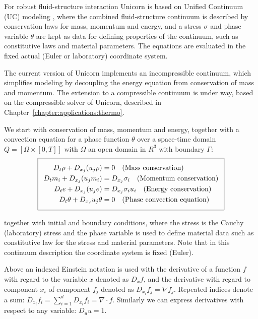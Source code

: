 For robust fluid-structure interaction Unicorn is based on Unified
Continuum (UC) modeling \cite{HoffmanJanssonEtAl2009}, where the
combined fluid-structure continuum is described by conservation laws
for mass, momentum and energy, and a stress $\sigma$ and phase
variable $\theta$ are kept as data for defining properties of the
continuum, such as constitutive laws and material parameters. The
equations are evaluated in the fixed actual (Euler or laboratory)
coordinate system.

The current version of Unicorn implements an incompressible continuum,
which simplifies modeling by decoupling the energy equation from
conservation of mass and momentum. The extension to a compressible
continuum is under way, based on the compressible solver of Unicorn,
described in Chapter~\ref{chapter:applications:thermo}.

We start with conservation of mass, momentum and energy, together with
a convection equation for a phase function $\theta$ over a space-time
domain $Q = [\Omega \times [0, T]]$ with $\Omega$ an open domain in
$R^3$ with boundary $\Gamma$:
\begin{equation}
  \addtolength{\fboxsep}{5pt}
  \boxed{
    \begin{split}\label{eq:TotalModel}
      D_t \rho + D_{x_j} (u_j \rho) &= 0
      \quad \text{(Mass conservation)}\\
      D_t m_i + D_{x_j} (u_j m_i) &= D_{x_j} \sigma_i
      \quad \text{(Momentum conservation)}\\
      D_t e + D_{x_j} (u_j e) &= D_{x_j} \sigma_i u_i
      \quad \text{(Energy conservation)}\\
      D_t \theta + D_{x_j} u_j \theta &= 0
      \quad \text{(Phase convection equation)}
    \end{split}
  }
\end{equation}

together with initial and boundary conditions, where the stress is the
Cauchy (laboratory) stress and the phase variable is used to define
material data such as constitutive law for the stress and material
parameters. Note that in this continuum description the coordinate
system is fixed (Euler).

Above an indexed Einstein notation is used with the derivative of a
function $f$ with regard to the variable $x$ denoted as $D_x f$, and
the derivative with regard to component $x_i$ of component $f_j$
denoted as $D_{x_i} f_j = \nabla f_j$. Repeated indices denote a sum:
$D_{x_i} f_i = \sum_{i=1}^d D_{x_i} f_i = \nabla \cdot f$. Similarly
we can express derivatives with respect to any variable: $D_u u = 1$.

